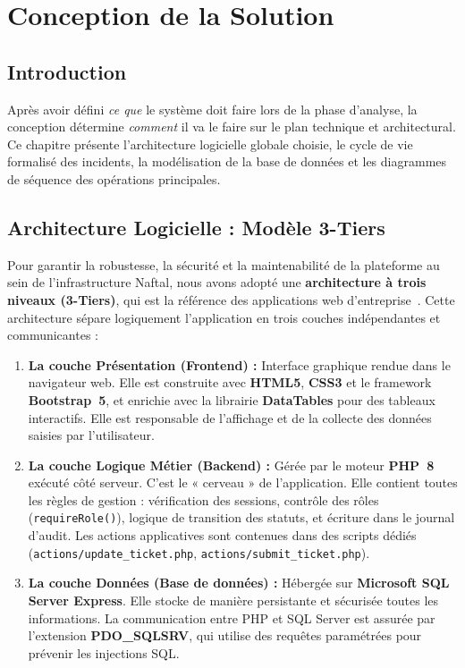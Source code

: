 \chapter{Conception de la Solution}

\section{Introduction}
Après avoir défini \textit{ce que} le système doit faire lors de la phase d'analyse,
la conception détermine \textit{comment} il va le faire sur le plan technique et
architectural. Ce chapitre présente l'architecture logicielle globale choisie, le cycle
de vie formalisé des incidents, la modélisation de la base de données et les diagrammes
de séquence des opérations principales.

\section{Architecture Logicielle : Modèle 3-Tiers}
Pour garantir la robustesse, la sécurité et la maintenabilité de la plateforme au sein
de l'infrastructure Naftal, nous avons adopté une \textbf{architecture à trois niveaux
(3-Tiers)}, qui est la référence des applications web d'entreprise~\cite{phpdoc}. Cette
architecture sépare logiquement l'application en trois couches indépendantes et
communicantes :

\begin{enumerate}
    \item \textbf{La couche Présentation (Frontend) :} Interface graphique rendue dans
    le navigateur web. Elle est construite avec \textbf{HTML5}, \textbf{CSS3} et le
    framework \textbf{Bootstrap~5}, et enrichie avec la librairie \textbf{DataTables}
    pour des tableaux interactifs. Elle est responsable de l'affichage et de la collecte
    des données saisies par l'utilisateur.

    \item \textbf{La couche Logique Métier (Backend) :} Gérée par le moteur
    \textbf{PHP~8} exécuté côté serveur. C'est le « cerveau » de l'application. Elle
    contient toutes les règles de gestion : vérification des sessions, contrôle des rôles
    (\texttt{requireRole()}), logique de transition des statuts, et écriture dans le journal
    d'audit. Les actions applicatives sont contenues dans des scripts dédiés
    (\texttt{actions/update\_ticket.php}, \texttt{actions/submit\_ticket.php}).

    \item \textbf{La couche Données (Base de données) :} Hébergée sur
    \textbf{Microsoft SQL Server Express}. Elle stocke de manière persistante et
    sécurisée toutes les informations. La communication entre PHP et SQL Server est
    assurée par l'extension \textbf{PDO\_SQLSRV}, qui utilise des requêtes paramétrées
    pour prévenir les injections SQL.
\end{enumerate}

